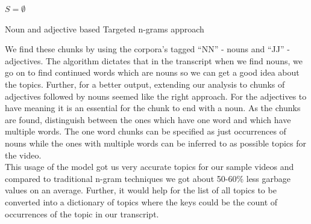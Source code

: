 \documentclass[conference]{IEEEtran}
\begin{document}
\begin{algorithm}
\SetAlgoLined
\DontPrintSemicolon
{}
	$S = \emptyset$\\

\caption{Noun and adjective based Targeted n-grams approach}
\end{algorithm}


We find these chunks by using the corpora’s tagged “NN” - nouns and “JJ” - adjectives. The algorithm dictates that in the transcript when we find nouns, we go on to find continued words which are nouns so we can get a good idea about the topics. Further, for a better output, extending our analysis to chunks of adjectives followed by nouns seemed like the right approach. For the adjectives to have meaning it is an essential for the chunk to end with a noun. As the chunks are found, distinguish between the ones which have one word and which have multiple words. The one word chunks can be specified as just occurrences of nouns while the ones with multiple words can be inferred to as possible topics for the video.\\
\indent This usage of the model got us very accurate topics for our sample videos and compared to traditional n-gram techniques we got about 50-60\% less garbage values on an average. Further, it would help for the list of all topics to be converted into a dictionary of topics where the keys could be the count of occurrences of the topic in our transcript.
\end{document}
